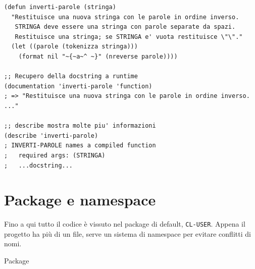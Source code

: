 \begin{esempio}
\begin{lstlisting}
(defun inverti-parole (stringa)
  "Restituisce una nuova stringa con le parole in ordine inverso.
   STRINGA deve essere una stringa con parole separate da spazi.
   Restituisce una stringa; se STRINGA e' vuota restituisce \"\"."
  (let ((parole (tokenizza stringa)))
    (format nil "~{~a~^ ~}" (nreverse parole))))

;; Recupero della docstring a runtime
(documentation 'inverti-parole 'function)
; => "Restituisce una nuova stringa con le parole in ordine inverso. ..."

;; describe mostra molte piu' informazioni
(describe 'inverti-parole)
; INVERTI-PAROLE names a compiled function
;   required args: (STRINGA)
;   ...docstring...
\end{lstlisting}
\end{esempio}

\section{Package e namespace}

Fino a qui tutto il codice è vissuto nel package
di default, \texttt{CL-USER}.
Appena il progetto ha più di un file, serve un sistema
di namespace per evitare conflitti di nomi.

\begin{concetto}{Package}

\boxsep
{}
\end{concetto}

